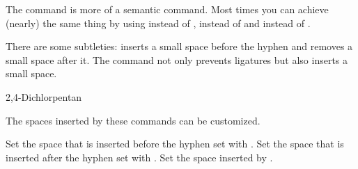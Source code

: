 \documentclass[load-preamble+]{cnltx-doc}
\begin{document}
\begin{example}
  \begin{minipage}{.4\linewidth}
  \end{minipage}
\end{example}
The  command is more of a semantic command.  Most times you can
achieve (nearly) the same thing by using \cs{-} instead of \cs{\textbar},
\code{-} instead of \cs{-} and  instead of
\cs{\textasciicircum}.

There are some subtleties: \cs{-} inserts a small space before the hyphen and
removes a small space after it.  The command \cs{\textbar} not only prevents
ligatures but also inserts a small space.
\begin{example}
  \huge{} \par
  2,4-Dichlorpentan
\end{example}

The spaces inserted by these commands can be customized.
\begin{options}
  \Default{.01em}
    Set the space that is inserted before the hyphen set with \cs{-}.
  \Default{-.03em}
    Set the space that is inserted after the hyphen set with \cs{-}.
  \Default{.01em}
    Set the space inserted by \cs{\textbar}.
\end{options}
\end{document}
